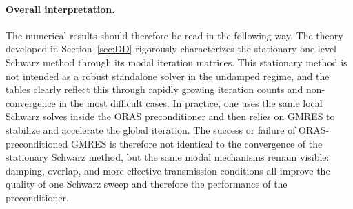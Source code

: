 \documentclass[smallextended]{svjour3}       %
\begin{document}
\paragraph{Overall interpretation.}
The numerical results should therefore be read in the following way. The theory developed in
Section~\ref{sec:DD} rigorously characterizes the stationary one-level Schwarz method through its
modal iteration matrices. This stationary method is not intended as a robust standalone solver in
the undamped regime, and the tables clearly reflect this through rapidly growing iteration counts
and non-convergence in the most difficult cases. In practice, one uses the same local Schwarz
solves inside the ORAS preconditioner and then relies on GMRES to stabilize and accelerate the
global iteration. The success or failure of ORAS-preconditioned GMRES is therefore not identical to
the convergence of the stationary Schwarz method, but the same modal mechanisms remain visible:
damping, overlap, and more effective transmission conditions all improve the quality of one Schwarz
sweep and therefore the performance of the preconditioner.




%

\end{document}
